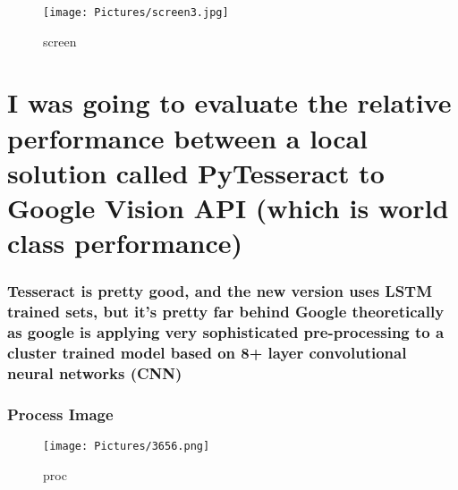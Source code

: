 \documentclass[11pt]{article}
\makeatletter
\def\maxwidth{\ifdim\Gin@nat@width>\linewidth\linewidth
    \else\Gin@nat@width\fi}
\let\Oldincludegraphics\includegraphics
\renewcommand{\includegraphics}[1]{\Oldincludegraphics[width=.8\maxwidth]{#1}}
\makeatother
\begin{document}
\begin{figure}
\centering
\texttt{[image: Pictures/screen3.jpg]}
\caption{screen}
\end{figure}

    \section{I was going to evaluate the relative performance between a
local solution called PyTesseract to Google Vision API (which is world
class
performance)}\label{i-was-going-to-evaluate-the-relative-performance-between-a-local-solution-called-pytesseract-to-google-vision-api-which-is-world-class-performance}

\subsubsection{Tesseract is pretty good, and the new version uses LSTM
trained sets, but it's pretty far behind Google theoretically as google
is applying very sophisticated pre-processing to a cluster trained model
based on 8+ layer convolutional neural networks
(CNN)}\label{tesseract-is-pretty-good-and-the-new-version-uses-lstm-trained-sets-but-its-pretty-far-behind-google-theoretically-as-google-is-applying-very-sophisticated-pre-processing-to-a-cluster-trained-model-based-on-8-layer-convolutional-neural-networks-cnn}

\subsubsection{Process Image}\label{process-image}

\begin{figure}
\centering
\texttt{[image: Pictures/3656.png]}
\caption{proc}
\end{figure}
\end{document}
